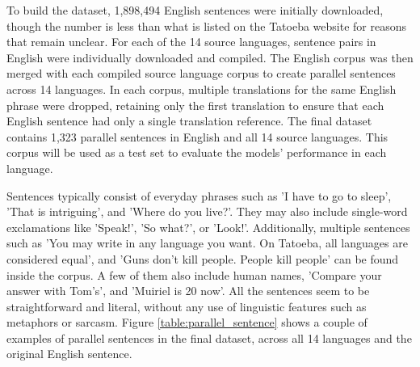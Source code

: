 \documentclass[a4paper, 11pt]{article}
\begin{document}
To build the dataset, 1,898,494 English sentences were initially downloaded, though the number is less than what is listed on the Tatoeba website for reasons that remain unclear. For each of the 14 source languages, sentence pairs in English were individually downloaded and compiled. The English corpus was then merged with each compiled source language corpus to create parallel sentences across 14 languages. In each corpus, multiple translations for the same English phrase were dropped, retaining only the first translation to ensure that each English sentence had only a single translation reference. The final dataset contains 1,323 parallel sentences in English and all 14 source languages. This corpus will be used as a test set to evaluate the models' performance in each language.

Sentences typically consist of everyday phrases such as 'I have to go to sleep', 'That is intriguing', and 'Where do you live?'. They may also include single-word exclamations like 'Speak!', 'So what?', or 'Look!'. Additionally, multiple sentences such as 'You may write in any language you want. On Tatoeba, all languages are considered equal', and 'Guns don't kill people. People kill people' can be found inside the corpus. A few of them also include human names, 'Compare your answer with Tom's', and 'Muiriel is 20 now'. All the sentences seem to be straightforward and literal, without any use of linguistic features such as metaphors or sarcasm. Figure \ref{table:parallel_sentence} shows a couple of examples of parallel sentences in the final dataset, across all 14 languages and the original English sentence.
\end{document}
